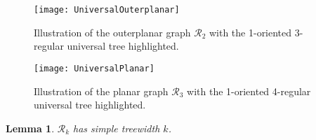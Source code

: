 \documentclass[a4paper,11pt]{article}
\theoremstyle{plain}
\newtheorem{lem}[thm]{Lemma}
\theoremstyle{definition}
\newcommand{\RR}{\mathcal{R}}
\begin{document}
\begin{figure}[!b]
\centering
\texttt{[image: UniversalOuterplanar]}
\caption{Illustration of the outerplanar graph $\RR_2$ with the 1-oriented 3-regular universal tree highlighted. }
\label{UniversalOuterplanar}
\end{figure}


\begin{figure}[!t]
    \centering
    \texttt{[image: UniversalPlanar]}
    \caption{Illustration of the planar graph $\RR_3$ with the 1-oriented 4-regular universal tree highlighted. }
    \label{UniversalPlanar}
\end{figure}


\begin{lem}
\label{SimpleTreewidthRk}
$\RR_k$ has simple treewidth $k$.
\end{lem}
\end{document}
